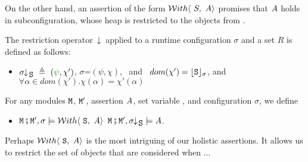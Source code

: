 On the other hand, an assertion of the form $\Using{A}{S}$ promises that $\A$ holds in subconfiguration, whose heap is restricted to the objects from .

 
 
\begin{definition}   \label{def:restrict}
The restriction operator~$\;\restrct{} {} $ applied to a runtime configuration $\sigma$ and a set $R$ is defined as follows:
 \label{def:config:restrct}
 $~ $

\begin{itemize}
\item
$\restrct {\sigma}{\prg{S}} \ \triangleq \ (\sd{\psi}, \chi')$, \IFF  $\sigma$=$(\psi,\chi)$, \ and  \  $dom(\chi')=\interp {\prg{S}} {\sigma}$, and   
 $\forall \alpha\!\in\!dom(\chi').\chi(\alpha)=\chi'(\alpha)$
\end{itemize}
\end{definition}

\begin{definition}  \label{def:valid:assertion:using}
For any modules $\M$, $\M'$, assertion  $\A$, set variable ,  and configuration $\sigma$, we define
\begin{itemize}
 \item
 $\M\mkpair \M', \sigma \models \Using {\A} {\prg{S}}$
 \IFF
 $\M\mkpair \M', \restrct \sigma {\prg{S}} \models  \A  $.
\end{itemize}
\end{definition}

Perhaps $\Using {\A} {\prg{S}}$ is the most intriguing of our holistic assertions. It allows us to restrict the set of objects that are considered when ...


